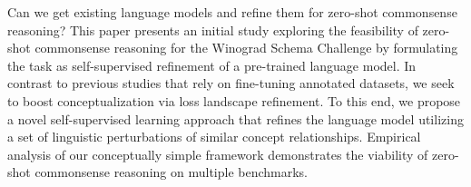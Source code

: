 Can we get existing language models and refine them for zero-shot commonsense reasoning? This paper presents an initial study exploring the feasibility of zero-shot commonsense reasoning for the Winograd Schema Challenge by formulating the task as self-supervised refinement of a pre-trained language model. In contrast to previous studies that rely on fine-tuning annotated datasets, we seek to boost conceptualization via loss landscape refinement. To this end, we propose a novel self-supervised learning approach that refines the language model utilizing a set of linguistic perturbations of similar concept relationships. Empirical analysis of our conceptually simple framework demonstrates the viability of zero-shot commonsense reasoning on multiple benchmarks.
